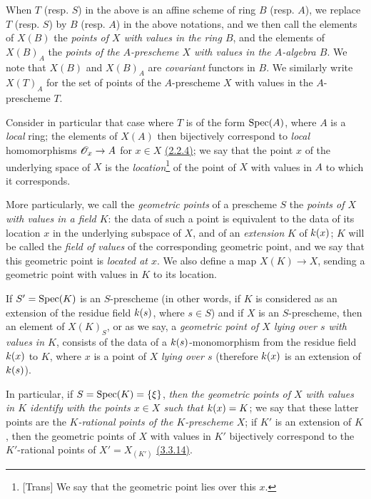 \begin{env}[3.4.4]
\label{env-1.3.4.4}
When $T$ (resp. $S$) in the above is an affine scheme of ring $B$ (resp. $A$), we replace
$T$ (resp. $S$) by $B$ (resp. $A$) in the above notations, and we then call the elements of
$X(B)$ the {\it points of $X$ with values in the ring $B$}, and the elements of $X(B)_A$ the
{\it points of the $A$-prescheme $X$ with values in the $A$-algebra $B$}. We note that
$X(B)$ and $X(B)_A$ are {\it covariant} functors in $B$. We similarly write $X(T)_A$ for the
set of points of the $A$-prescheme $X$ with values in the $A$-prescheme $T$.
\end{env}

\begin{env}[3.4.5]
\label{env-1.3.4.5}
Consider in particular that case where $T$ is of the form ${\mathop{\mathrm{Spec}}\nolimits}(A)$, where $A$ is a
{\it local} ring; the elements of $X(A)$ then bijectively correspond to {\it local}
homomorphisms $\mathscr{O}_x\to A$ for $x\in X$ \hyperref[prop-1.2.2.4]{(2.2.4)}; we say that the
point $x$ of the underlying space of $X$ is the {\it location}\footnote{[Trans] We say that
the geometric point lies over this $x$.} of the point of $X$ with values in $A$ to which it
corresponds.

More particularly, we call the {\it geometric points} of a prescheme $S$ the {\it points of
$X$ with values in a field $K$}: the data of such a point is equivalent to the data of its
location $x$ in the underlying subspace of $X$, and of an {\it extension} $K$ of $k(x)$;
$K$ will be called the {\it field of values} of the corresponding geometric point, and we
say that this geometric point is {\it located at $x$}. We also define a map $X(K)\to X$,
sending a geometric point with values in $K$ to its location.

If $S'={\mathop{\mathrm{Spec}}\nolimits}(K)$ is an $S$-prescheme (in other words, if $K$ is considered as an extension
of the residue field $k(s)$, where $s\in S$) and if $X$ is an $S$-prescheme, then an
element of $X(K)_S$, or as we say, a {\it geometric point of $X$ lying over $s$ with values
in $K$}, consists of the data of a $k(s)$-monomorphism from the residue field $k(x)$
to $K$, where $x$ is a point of $X$ {\it lying over $s$} (therefore $k(x)$ is an
extension of $k(s)$).

In particular, if $S={\mathop{\mathrm{Spec}}\nolimits}(K)=\{\xi\}$, {\it then the geometric points of $X$ with values in
$K$ identify with the points $x\in X$ such that $k(x)=K$}; we say that these latter
points are the {\it $K$-rational points of the $K$-prescheme $X$}; if $K'$ is an extension
of $K$, then the geometric points of $X$ with values in $K'$ bijectively correspond to the
$K'$-rational points of $X'=X_{(K')}$ \hyperref[env-1.3.3.14]{(3.3.14)}.
\end{env}

